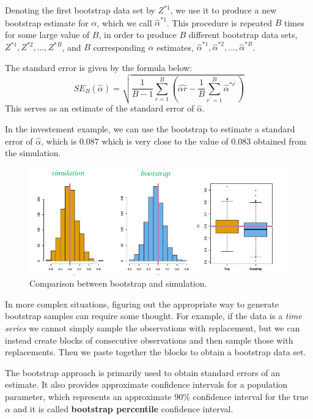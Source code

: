 Denoting the first bootstrap data set by $Z^{\ast 1}$, we use it to produce a new bootstrap estimate for $\alpha$, which we call $\hat{\alpha}^{\ast 1}$. This procedure is repeated $B$ times for some large value of $B$, in order to produce $B$ different bootstrap data sets, $Z^{\ast 1}, Z^{\ast 2}, \dots, Z^{\ast B}$, and $B$ corresponding $\alpha$ estimates, $\hat{\alpha}^{\ast 1}, \hat{\alpha}^{\ast 2}, \dots, \hat{\alpha}^{\ast B}$.

The standard error is given by the formula below:
\[
    SE_B(\hat{\alpha}) = \sqrt{\frac{1}{B-1} \sum_{r=1}^{B} \left(\hat{\alpha r} - \frac{1}{B} \sum_{r^{\prime} =1}^{B} \hat{\alpha}^{\ast r^{\prime} }\right)}
\]
This serves as an estimate of the standard error of $\hat{\alpha}$.

In the investement example, we can use the bootstrap to estimate a standard error of $\hat{\alpha}$, which is $0.087$ which is very close to the value of $0.083$ obtained from the simulation.

\begin{figure}[ht]
    \centering
    \includegraphics[width=0.8\linewidth]{./figures/lec_15_bootstrap_2.png}
    \caption{Comparison between bootstrap and simulation.}
    \label{fig:lec_15_bootstrap_2}

\end{figure}

In more complex situations, figuring out the appropriate way to generate bootstrap samples can require some thought. For example, if the data is a \textit{time series} we cannot simply sample the observations with replacement, but we can instead create blocks of consecutive observations and then sample those with replacements. Then we paste together the blocks to obtain a bootstrap data set.


The bootstrap approach is primarily used to obtain standard errors of an estimate. It also provides approximate confidence intervals for a population parameter, which represents an approximate $90\%$ confidence interval for the true $\alpha$ and it is called \textbf{bootstrap percentile} confidence interval.

